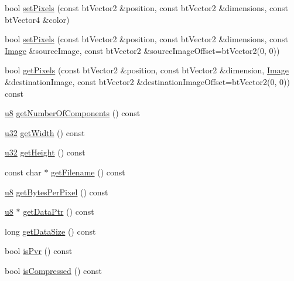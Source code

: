 \begin{DoxyCompactItemize}
\item 
bool \mbox{\hyperlink{classnjli_1_1_image_ab28fe1d7ea14d262795c549040d17f85}{set\+Pixels}} (const bt\+Vector2 \&position, const bt\+Vector2 \&dimensions, const bt\+Vector4 \&color)
\item 
bool \mbox{\hyperlink{classnjli_1_1_image_aa1fd01f4597a64ef7bb83eab78bfa1b6}{set\+Pixels}} (const bt\+Vector2 \&position, const bt\+Vector2 \&dimensions, const \mbox{\hyperlink{classnjli_1_1_image}{Image}} \&source\+Image, const bt\+Vector2 \&source\+Image\+Offset=bt\+Vector2(0, 0))
\item 
bool \mbox{\hyperlink{classnjli_1_1_image_a8403c40ff10118ec972dd1b45942a520}{get\+Pixels}} (const bt\+Vector2 \&position, const bt\+Vector2 \&dimension, \mbox{\hyperlink{classnjli_1_1_image}{Image}} \&destination\+Image, const bt\+Vector2 \&destination\+Image\+Offset=bt\+Vector2(0, 0)) const
\item 
\mbox{\hyperlink{_util_8h_aed742c436da53c1080638ce6ef7d13de}{u8}} \mbox{\hyperlink{classnjli_1_1_image_a490b9ccd20f362efca9c2a9b84563e34}{get\+Number\+Of\+Components}} () const
\item 
\mbox{\hyperlink{_util_8h_a10e94b422ef0c20dcdec20d31a1f5049}{u32}} \mbox{\hyperlink{classnjli_1_1_image_ad8861c346cef86545c02d0b7e86285b9}{get\+Width}} () const
\item 
\mbox{\hyperlink{_util_8h_a10e94b422ef0c20dcdec20d31a1f5049}{u32}} \mbox{\hyperlink{classnjli_1_1_image_af3552099b60aaa6a20a94d12d25cd01e}{get\+Height}} () const
\item 
const char $\ast$ \mbox{\hyperlink{classnjli_1_1_image_a02b7315aabbab49269b1b6091c7c0ae5}{get\+Filename}} () const
\item 
\mbox{\hyperlink{_util_8h_aed742c436da53c1080638ce6ef7d13de}{u8}} \mbox{\hyperlink{classnjli_1_1_image_a522283bd78e506d96a7bc512a10a73d6}{get\+Bytes\+Per\+Pixel}} () const
\item 
\mbox{\hyperlink{_util_8h_aed742c436da53c1080638ce6ef7d13de}{u8}} $\ast$ \mbox{\hyperlink{classnjli_1_1_image_a447f4bbf6b076c459829a6aac5d85fbf}{get\+Data\+Ptr}} () const
\item 
long \mbox{\hyperlink{classnjli_1_1_image_a501bfe4e71d61a4126b98f6f9b2ef76d}{get\+Data\+Size}} () const
\item 
bool \mbox{\hyperlink{classnjli_1_1_image_a7db60904e8f2631b6d97762ec6202498}{is\+Pvr}} () const
\item 
bool \mbox{\hyperlink{classnjli_1_1_image_a6639f89fa4b962afff9dfc6c6b242c64}{is\+Compressed}} () const
\item 

\end{DoxyCompactItemize}
